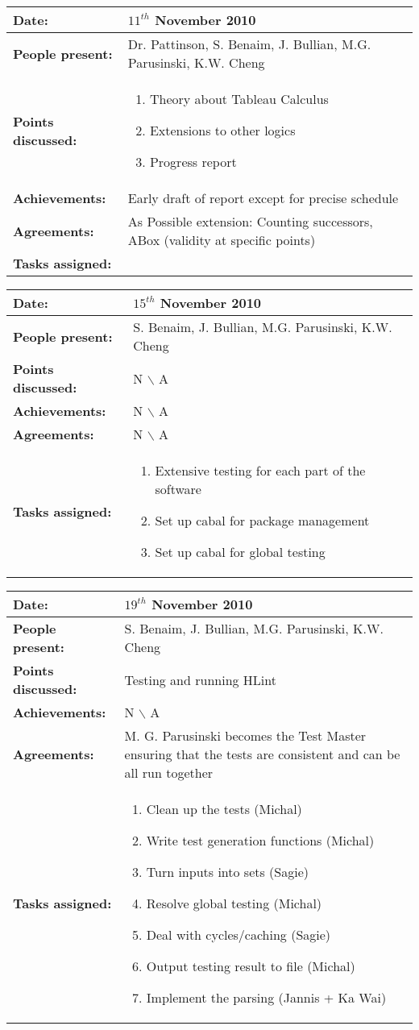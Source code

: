 \documentclass[12pt,a4paper]{article}
\newcommand{\meeting}[6]{%
\begin{center}%
\begin{longtable}{| p{3.5cm} | | p{13cm} |}%
\hline%
\textbf{Date:} & #1 \\%
\hline%
\textbf{People present:} &#2 \\%
\hline%
\textbf{Points discussed:} &#3\\%
\hline%
\textbf{Achievements:} &#4 \\%
\hline%
\textbf{Agreements:} &#5 \\%
\hline%
\textbf{Tasks assigned:} &#6  \\%
\hline%
\end{longtable}%
\end{center}%
\bigbreak
}
\begin{document}
\meeting{$11^{th}$ November 2010}%
{Dr. Pattinson, S. Benaim, J. Bullian, M.G. Parusinski, K.W. Cheng}%
{\begin{enumerate}
\item Theory about Tableau Calculus
\item Extensions to other logics
\item Progress report
\end{enumerate} }%
{Early draft of report except for precise schedule}
{As Possible extension: Counting successors, ABox (validity at specific points)}%
{}%

\meeting{$15^{th}$ November 2010}%
{S. Benaim, J. Bullian, M.G. Parusinski, K.W. Cheng}%
{N $\backslash$ A}%
{N $\backslash$ A}%
{N $\backslash$ A}
{\begin{enumerate}
\item Extensive testing for each part of the software
\item Set up cabal for package management
\item Set up cabal for global testing
\end{enumerate}}%

\meeting{$19^{th}$ November 2010}%
{S. Benaim, J. Bullian, M.G. Parusinski, K.W. Cheng}%
{Testing and running HLint}%
{N $\backslash$ A}%
{M. G. Parusinski becomes the Test Master ensuring that the tests are consistent and can be all run together}
{\begin{enumerate}
\item Clean up the tests (Michal) 
\item Write test generation functions (Michal)
\item Turn inputs into sets (Sagie)
\item Resolve global testing (Michal)
\item Deal with cycles/caching (Sagie)
\item Output testing result to file (Michal)
\item Implement the parsing (Jannis + Ka Wai)
\end{enumerate}}%
\end{document}
